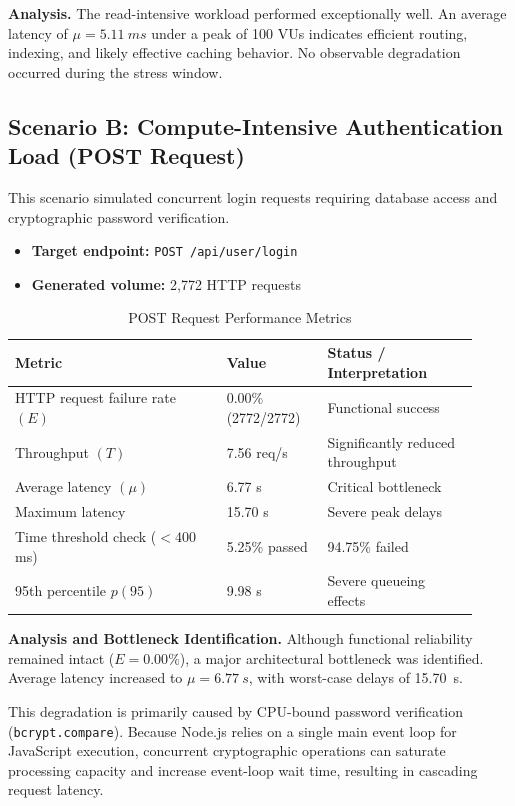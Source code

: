 \documentclass[12pt,a4paper]{article}
\begin{document}
\textbf{Analysis.}
The read-intensive workload performed exceptionally well. An average latency of
$\mu = \SI{5.11}{ms}$ under a peak of 100 VUs indicates efficient routing, indexing, and likely
effective caching behavior. No observable degradation occurred during the stress window.

\subsection{Scenario B: Compute-Intensive Authentication Load (POST Request)}

This scenario simulated concurrent login requests requiring database access and
cryptographic password verification.

\begin{itemize}[leftmargin=1.5em]
    \item \textbf{Target endpoint:} \texttt{POST /api/user/login}
    \item \textbf{Generated volume:} 2,772 HTTP requests
\end{itemize}

\begin{table}[h!]
\centering
\caption{POST Request Performance Metrics}
\begin{tabular}{p{0.42\linewidth} p{0.20\linewidth} p{0.30\linewidth}}
\toprule
\textbf{Metric} & \textbf{Value} & \textbf{Status / Interpretation} \\
\midrule
HTTP request failure rate $(E)$ & 0.00\% (2772/2772) & Functional success \\
Throughput $(T)$ & 7.56 req/s & Significantly reduced throughput \\
Average latency $(\mu)$ & 6.77 s & Critical bottleneck \\
Maximum latency & 15.70 s & Severe peak delays \\
Time threshold check ($<400$ ms) & 5.25\% passed & 94.75\% failed \\
95th percentile $p(95)$ & 9.98 s & Severe queueing effects \\
\bottomrule
\end{tabular}
\end{table}

\textbf{Analysis and Bottleneck Identification.}
Although functional reliability remained intact ($E = 0.00\%$), a major architectural bottleneck
was identified. Average latency increased to $\mu = \SI{6.77}{s}$, with worst-case delays of \SI{15.70}{s}.

This degradation is primarily caused by CPU-bound password verification (\texttt{bcrypt.compare}).
Because Node.js relies on a single main event loop for JavaScript execution, concurrent
cryptographic operations can saturate processing capacity and increase event-loop wait time,
resulting in cascading request latency.
\end{document}
